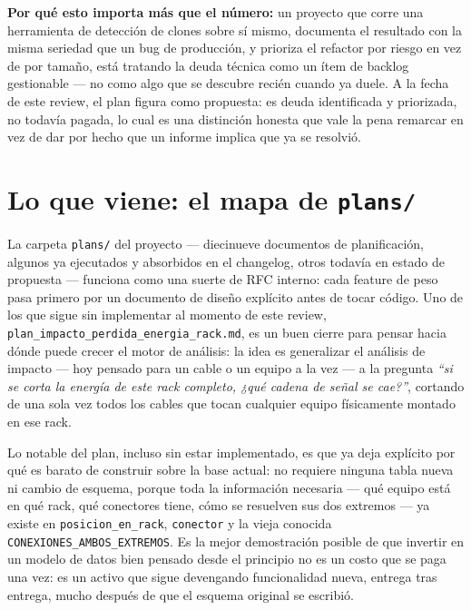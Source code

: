 \documentclass[11pt,twocolumn]{article}
\begin{document}
\begin{pullquote}
\headfont\textbf{Por qué esto importa más que el número:} un proyecto que corre una herramienta de detección de clones sobre sí mismo, documenta el resultado con la misma seriedad que un bug de producción, y prioriza el refactor por riesgo en vez de por tamaño, está tratando la deuda técnica como un ítem de backlog gestionable --- no como algo que se descubre recién cuando ya duele. A la fecha de este review, el plan figura como propuesta: es deuda identificada y priorizada, no todavía pagada, lo cual es una distinción honesta que vale la pena remarcar en vez de dar por hecho que un informe implica que ya se resolvió.
\end{pullquote}

\section{Lo que viene: el mapa de \texttt{plans/}}

La carpeta \texttt{plans/} del proyecto --- diecinueve documentos de planificación, algunos ya ejecutados y absorbidos en el changelog, otros todavía en estado de propuesta --- funciona como una suerte de RFC interno: cada feature de peso pasa primero por un documento de diseño explícito antes de tocar código. Uno de los que sigue sin implementar al momento de este review, \texttt{plan\_impacto\_perdida\_energia\_rack.md}, es un buen cierre para pensar hacia dónde puede crecer el motor de análisis: la idea es generalizar el análisis de impacto --- hoy pensado para un cable o un equipo a la vez --- a la pregunta \emph{``si se corta la energía de este rack completo, ¿qué cadena de señal se cae?''}, cortando de una sola vez todos los cables que tocan cualquier equipo físicamente montado en ese rack.

Lo notable del plan, incluso sin estar implementado, es que ya deja explícito por qué es barato de construir sobre la base actual: no requiere ninguna tabla nueva ni cambio de esquema, porque toda la información necesaria --- qué equipo está en qué rack, qué conectores tiene, cómo se resuelven sus dos extremos --- ya existe en \texttt{posicion\_en\_rack}, \texttt{conector} y la vieja conocida \texttt{CONEXIONES\_AMBOS\_EXTREMOS}. Es la mejor demostración posible de que invertir en un modelo de datos bien pensado desde el principio no es un costo que se paga una vez: es un activo que sigue devengando funcionalidad nueva, entrega tras entrega, mucho después de que el esquema original se escribió.
\end{document}
